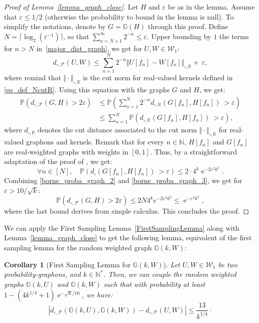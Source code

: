 \documentclass{amsart}
\theoremstyle{plain}
\newtheorem{corol}[Th]{Corollary}
\theoremstyle{definition}
\newcommand{\bbG}{\mathbb{G}}
\newcommand{\Graphon}{\mathcal{W}_1}
\newcommand{\dcutR}{d_{\square,\R}}
\newcommand{\NcutR}[1]{\Vert#1\Vert_{\square,\R}}
\newcommand{\NcutRSymbol}{\Vert\cdot\Vert_{\square,\R}}
\newcommand{\dcutF}{d_{\square,\mathcal{F}}}
\newcommand{\Prb}{\mathbb{P}}
\newcommand{\N}{\mathbb{N}}
\newcommand{\R}{\mathbb{R}}
\newcommand{\eps}{\varepsilon}
\DeclareMathOperator{\e}{e}
\begin{document}
\begin{proof}[Proof of Lemma~\ref{lemma_graph_close}]
Let $H$ and $\eps$ be as in the lemma.
Assume that $\eps \leq 1/2$ (otherwise the probability to bound in the lemma is null).
To simplify the notations, denote by $G = \mathbb{G}(H)$
through this proof.
Define $N=\lceil \log_2(\eps^{-1}) \rceil$,
so that $\sum_{n = N+1}^\infty 2^{-n} \allowbreak \leq \eps$.
Upper bounding by $1$ the terms for $n > N$
in~\eqref{major_dist_graph}, we get for $U,W\in\Graphon$: 
\begin{equation*}
\dcutF(U,W)
\leq \sum_{n=1}^N 2^{-n} \NcutR{U[f_n] - W[f_n]}	+\ \eps	 ,
\end{equation*}
where remind that $\NcutRSymbol$ is the cut norm for real-valued kernels
	defined in \eqref{eq_def_NcutR}.
Using this equation with the graphs $G$ and $H$, we get:
\begin{align}
\Prb(\dcutF(G,H) > 2\eps )
& \leq \Prb\left(\sum_{n=1}^N 2^{-n} \dcutR(G[f_n], H[f_n]) \ > \eps \right) \nonumber\\
& \leq \sum_{n=1}^N \Prb\left( \dcutR(G[f_n], H[f_n]) \ > \eps \right)	 ,
\label{borne_proba_graph_2}
\end{align}
where $\dcutR$ denotes the cut distance associated to the cut norm $\NcutRSymbol$
	for real-valued graphons and kernels.
Remark that for every $n\in\N$,
$H[f_n]$ and $G[f_n]$ are real-weighted graphs with weights in $[0,1]$.
Thus, by a straightforward adaptation of the proof of \cite[Lemma 10.11]{Lovasz},
we get:
\begin{equation}\label{borne_proba_graph_3}
\forall n \in [ N ],\quad
\Prb( d_\square(G[f_n], H[f_n]) \ > \eps ) \leq 2 \cdot 4^k \e^{-2 \eps^2 k^2}	 .
\end{equation}
Combining \eqref{borne_proba_graph_2} and \eqref{borne_proba_graph_3},
we get for $\eps > 10 / \sqrt{k}$:
\begin{equation*}
\Prb(\dcutF(G,H) > 2\eps ) \leq 2 N  4^k e^{-2 \eps^2 k^2}	
\leq \e^{-\eps^2 k^2 },
\end{equation*}
where the last bound derives from simple calculus.
This concludes the proof.
\end{proof}



We can apply the First Sampling Lemma~\ref{FirstSamplingLemma} along with
Lemma~\ref{lemma_graph_close} to get the following lemma,
equivalent of the first sampling lemma for 
the random weighted graph $\mathbb{G}(k,W)$:

\begin{corol}[First Sampling Lemma for $\bbG(k,W)$]
Let $U,W\in\Graphon$ be two probability-graphons, and $k \in \N^*$.
Then, we can couple the random weighted graphs
$\mathbb{G}(k,U)$ and $\mathbb{G}(k,W)$ such that
with probability at least $1 - (4k^{1/4}+1)\e^{-\sqrt{k}/10}$, we have:
\[ \left| \dcutF(\mathbb{G}(k,U), \mathbb{G}(k,W)) - \dcutF(U,W) \right|
\leq \frac{13}{k^{1/4}}	 \cdot \]
\end{corol}
\end{document}
